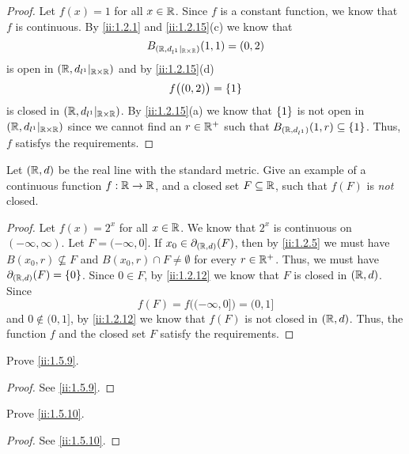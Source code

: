 \begin{proof}
  Let \(f(x) = 1\) for all \(x \in \mathbb{R}\).
  Since \(f\) is a constant function, we know that \(f\) is continuous.
  By \cref{ii:1.2.1} and \cref{ii:1.2.15}(c) we know that
  \[
    B_{(\mathbb{R}, d_{l^1}|_{\mathbb{R} \times \mathbb{R}})}(1, 1) = (0, 2)
  \]
  is open in \((\mathbb{R}, d_{l^1}|_{\mathbb{R} \times \mathbb{R}})\) and by \cref{ii:1.2.15}(d)
  \[
    f\big((0, 2)\big) = \left\lbrace1\right\rbrace
  \]
  is closed in \((\mathbb{R}, d_{l^1}|_{\mathbb{R} \times \mathbb{R}})\).
  By \cref{ii:1.2.15}(a) we know that \(\left\lbrace1\right\rbrace\) is not open in \((\mathbb{R}, d_{l^1}|_{\mathbb{R} \times \mathbb{R}})\) since we cannot find an \(r \in \mathbb{R}^+\) such that \(B_{(\mathbb{R}, d_{l^1})}(1, r) \subseteq \left\lbrace1\right\rbrace\).
  Thus, \(f\) satisfys the requirements.
\end{proof}

\begin{ex}\label{ii:ex:1.5.5}
  Let \((\mathbb{R}, d)\) be the real line with the standard metric.
  Give an example of a continuous function \(f : \mathbb{R} \to \mathbb{R}\), and a closed set \(F \subseteq \mathbb{R}\), such that \(f(F)\) is \emph{not} closed.
\end{ex}

\begin{proof}
  Let \(f(x) = 2^x\) for all \(x \in \mathbb{R}\).
  We know that \(2^x\) is continuous on \((-\infty, \infty)\).
  Let \(F = (-\infty, 0]\).
  If \(x_0 \in \partial_{(\mathbb{R}, d)}(F)\), then by \cref{ii:1.2.5} we must have \(B(x_0, r) \not\subseteq F\) and \(B(x_0, r) \cap F \neq \emptyset\) for every \(r \in \mathbb{R}^+\).
  Thus, we must have \(\partial_{(\mathbb{R}, d)}(F) = \left\lbrace0\right\rbrace\).
  Since \(0 \in F\), by \cref{ii:1.2.12} we know that \(F\) is closed in \((\mathbb{R}, d)\).
  Since
  \[
    f(F) = f\big((-\infty, 0]\big) = (0, 1]
  \]
  and \(0 \notin (0, 1]\), by \cref{ii:1.2.12} we know that \(f(F)\) is not closed in \((\mathbb{R}, d)\).
  Thus, the function \(f\) and the closed set \(F\) satisfy the requirements.
\end{proof}

\begin{ex}\label{ii:ex:1.5.6}
  Prove \cref{ii:1.5.9}.
\end{ex}

\begin{proof}
  See \cref{ii:1.5.9}.
\end{proof}

\begin{ex}\label{ii:ex:1.5.7}
  Prove \cref{ii:1.5.10}.
\end{ex}

\begin{proof}
  See \cref{ii:1.5.10}.
\end{proof}

